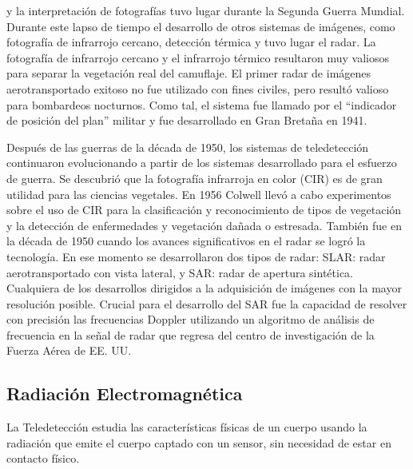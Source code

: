 y la interpretación de fotografías tuvo lugar durante la Segunda Guerra Mundial. Durante este lapso de tiempo el
desarrollo de otros sistemas de imágenes, como fotografía de infrarrojo cercano, detección térmica
y tuvo lugar el radar. La fotografía de infrarrojo cercano y el infrarrojo térmico resultaron muy valiosos para
separar la vegetación real del camuflaje. El primer radar de imágenes aerotransportado exitoso no fue
utilizado con fines civiles, pero resultó valioso para bombardeos nocturnos. Como tal, el sistema
fue llamado por el ``indicador de posición del plan'' militar y fue desarrollado en Gran Bretaña en
1941.

Después de las guerras de la década de 1950, los sistemas de teledetección continuaron evolucionando a partir de los sistemas
desarrollado para el esfuerzo de guerra. Se descubrió que la fotografía infrarroja en color (CIR) es de gran utilidad
para las ciencias vegetales. En 1956 Colwell llevó a cabo experimentos sobre el uso de CIR para
la clasificación y reconocimiento de tipos de vegetación y la detección de enfermedades y
vegetación dañada o estresada. También fue en la década de 1950 cuando los avances significativos en el radar
se logró la tecnología. En ese momento se desarrollaron dos tipos de radar: SLAR: radar aerotransportado con vista lateral, y SAR: radar de apertura sintética. Cualquiera de los desarrollos dirigidos a la
adquisición de imágenes con la mayor resolución posible. Crucial para el desarrollo del SAR fue
la capacidad de resolver con precisión las frecuencias Doppler utilizando un algoritmo de análisis de frecuencia en
la señal de radar que regresa del centro de investigación de la Fuerza Aérea de EE. UU.

\subsection{Radiación Electromagnética}

La Teledetección estudia las características físicas de un cuerpo usando la radiación que emite el cuerpo captado con un sensor, sin necesidad de estar en contacto físico. 

